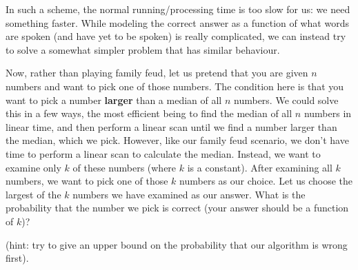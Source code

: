 \documentclass[11pt]{article}
\begin{document}
\noindent In such a scheme, the normal running/processing time is too slow for us: we need something faster. While modeling the correct answer as a function of what words are spoken (and have yet to be spoken) is really complicated, we can instead try to solve a somewhat simpler problem that has similar behaviour.\newline

\noindent Now, rather than playing family feud, let us pretend that you are given $n$ numbers and want to pick one of those numbers. The condition here is that you want to pick a number \textbf{larger} than a median of all $n$ numbers. We could solve this in a few ways, the most efficient being to find the median of all $n$ numbers in linear time, and then perform a linear scan until we find a number larger than the median, which we pick. However, like our family feud scenario, we don't have time to perform a linear scan to calculate the median. Instead, we want to examine only $k$ of these numbers (where $k$ is a constant). After examining all $k$ numbers, we want to pick one of those $k$ numbers as our choice. Let us choose the largest of the $k$ numbers we have examined as our answer. What is the probability that the number we pick is correct (your answer should be a function of $k$)?\newline\newline

\noindent (hint: try to give an upper bound on the probability that our algorithm is wrong first).\newpage
\end{document}
